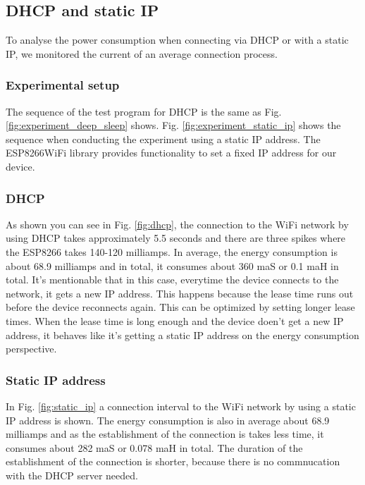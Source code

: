 \subsection{DHCP and static IP}
To analyse the power consumption when connecting via DHCP or with a static IP, we monitored the current of an average connection process.\\

\subsubsection{Experimental setup}
The sequence of the test program for DHCP is the same as Fig. \ref{fig:experiment_deep_sleep} shows.
Fig. \ref{fig:experiment_static_ip} shows the sequence when conducting the experiment using a static IP address.
The ESP8266WiFi library provides functionality to set a fixed IP address for our device.\\

\subsubsection{DHCP}
As shown you can see in Fig. \ref{fig:dhcp}, the connection to the WiFi network by using DHCP takes approximately 5.5 seconds and there are three spikes where the ESP8266 takes 140-120 milliamps.
In average, the energy consumption is about 68.9 milliamps and in total, it consumes about 360 maS or 0.1 maH in total.
It's mentionable that in this case, everytime the device connects to the network, it gets a new IP address. This happens because the lease time runs out before the device reconnects again.
This can be optimized by setting longer lease times. When the lease time is long enough and the device doen't get a new IP address, it behaves like it's getting a static IP address on the energy consumption perspective.\\

\subsubsection{Static IP address}
In Fig. \ref{fig:static_ip} a connection interval to the WiFi network by using a static IP address is shown. 
The energy consumption is also in average about 68.9 milliamps and as the establishment of the connection is takes less time, it consumes about 282 maS or 0.078 maH in total.
The duration of the establishment of the connection is shorter, because there is no commnucation with the DHCP server needed.



